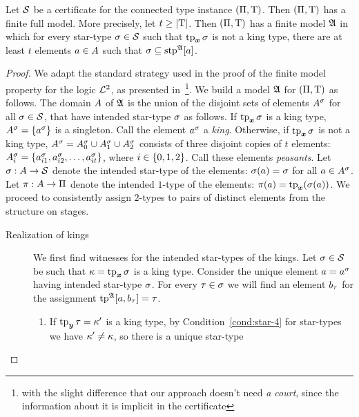 \begin{lemma}\label{lem:cert-expand}
Let $\mathcal{S}$ be a certificate for the connected type instance $(\Pi,\mathrm{T})$.
Then $(\Pi,\mathrm{T})$ has a finite full model. More precisely, let $t \geq
\left|\mathrm{T}\right|$. Then $(\Pi,\mathrm{T})$ has a finite model $\mathfrak{A}$ in which for every
star-type $\sigma \in \mathcal{S}$ such that $\operatorname{tp}_{\bm{x}}\sigma$ is not a king type, there are
at least $t$ elements $a \in A$ such that $\sigma \subseteq
\operatorname{stp}^{\mathfrak{A}}[a]$.
\end{lemma}
\begin{proof}
We adapt the standard strategy used in the proof of the finite model property
for the logic $\mathcal{L}^{2}$, as presented in~\cite{gradel1999logics}\footnote{with
the slight difference that our approach doesn't need \emph{a court},
since the information about it is implicit in the certificate}.
We build a model $\mathfrak{A}$ for $(\Pi,\mathrm{T})$ as follows.
The domain $A$ of $\mathfrak{A}$ is the union of the disjoint sets of elements
$A^\sigma$ for all $\sigma \in \mathcal{S}$, that have intended star-type $\sigma$
as follows.
If $\operatorname{tp}_{\bm{x}}\sigma$ is a king type, $A^\sigma = \left\{a^\sigma\right\}$ is a
singleton. Call the element $a^\sigma$ a \emph{king}.
Otherwise, if $\operatorname{tp}_{\bm{x}}\sigma$ is not a king type, $A^\sigma = A^\sigma_0
\cup A^\sigma_1 \cup A^\sigma_2$ consists of three disjoint copies of $t$
elements:  $A^\sigma_i = \left\{a^\sigma_{i1}, a^\sigma_{i2}, \dots,
a^\sigma_{it}\right\}$, where $i \in \left\{0,1,2\right\}$. Call these elements
\emph{peasants}.
Let $\sigma : A \to \mathcal{S}$ denote the intended star-type of the elements:
$\sigma(a) = \sigma$ for all $a \in A^\sigma$.
Let $\pi : A \to \Pi$ denote the intended $1$-type of the elements:
$\pi(a) = \operatorname{tp}_{\bm{x}}(\sigma(a))$.
We proceed to consistently assign $2$-types to pairs of distinct elements from
the structure on stages.
\begin{description}
  \item[Realization of kings] We first find witnesses for the intended
  star-types of the kings.
  Let $\sigma \in \mathcal{S}$ be such that $\kappa = \operatorname{tp}_{\bm{x}}\sigma$ is a king type.
  Consider the unique element $a = a^\sigma$ having intended star-type
  $\sigma$.
  For every $\tau \in \sigma$ we will find an element $b_\tau$ for the
  assignment $\operatorname{tp}^{\mathfrak{A}}[a,b_\tau] = \tau$.
  \begin{enumerate}
  \item If $\operatorname{tp}_{\bm{y}}\tau = {\kappa'}$ is a king type, by Condition~\ref{cond:star-4}
  for star-types we have ${\kappa'} \neq \kappa$, so there is a unique star-type

\end{enumerate}
\end{description}
\end{proof}
